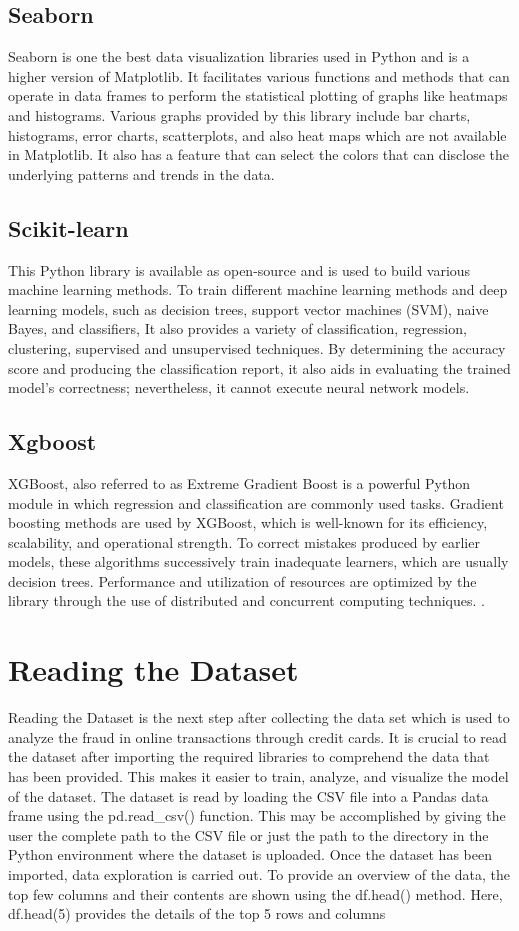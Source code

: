 \subsection{Seaborn}
Seaborn is one the best data visualization libraries used in Python and is a higher version of Matplotlib. It facilitates various functions and methods that can operate in data frames to perform the statistical plotting of graphs like heatmaps and histograms. Various graphs provided by this library include bar charts, histograms, error charts, scatterplots, and also heat maps which are not available in Matplotlib. It also has a feature that can select the colors that can disclose the underlying patterns and trends in the data.

\subsection{Scikit-learn}
This Python library is available as open-source and is used to build various machine learning methods. To train different machine learning methods and deep learning models, such as decision trees, support vector machines (SVM), naive Bayes, and classifiers, It also provides a variety of classification, regression, clustering, supervised and unsupervised techniques. By determining the accuracy score and producing the classification report, it also aids in evaluating the trained model's correctness; nevertheless, it cannot execute neural network models.

\subsection{Xgboost}
XGBoost, also referred to as Extreme Gradient Boost is a powerful Python module in which regression and classification are commonly used tasks. Gradient boosting methods are used by XGBoost, which is well-known for its efficiency, scalability, and operational strength. To correct mistakes produced by earlier models, these algorithms successively train inadequate learners, which are usually decision trees. Performance and utilization of resources are optimized by the library through the use of distributed and concurrent computing techniques.
.
\section{Reading the Dataset}
Reading the Dataset is the next step after collecting the data set which is used to analyze the fraud in online transactions through credit cards. It is crucial to read the dataset after importing the required libraries to comprehend the data that has been provided. This makes it easier to train, analyze, and visualize the model of the dataset. The dataset is read by loading the CSV file into a Pandas data frame using the pd.read\_csv() function. This may be accomplished by giving the user the complete path to the CSV file or just the path to the directory in the Python environment where the dataset is uploaded. Once the dataset has been imported, data exploration is carried out. To provide an overview of the data, the top few columns and their contents are shown using the df.head() method. Here, df.head(5) provides the details of the top 5 rows and columns 


